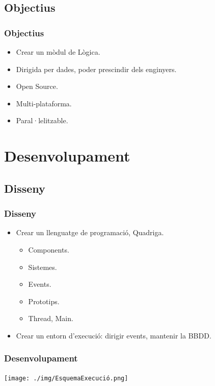 \documentclass[serif,9pt]{beamer}
\begin{document}
  \subsection{Objectius}

    \begin{frame}\frametitle{Objectius}
      \begin{itemize}
        \item Crear un mòdul de Lògica. \pause
        \item Dirigida per dades, poder prescindir dels enginyers. \pause
        \item Open Source. \pause
        \item Multi-plataforma. \pause
        \item Paral·lelitzable.
      \end{itemize}
    \end{frame}

\section{Desenvolupament}

  \subsection{Disseny}

    \begin{frame}\frametitle{Disseny}
      \begin{itemize}
        \item Crear un llenguatge de programació, Quadriga. \pause\medskip
        \begin{itemize}
          \item Components.
          \item Sistemes.
          \item Events.
          \item Prototips.
          \item Thread, Main.
        \end{itemize}\pause
        \item Crear un entorn d'execució: dirigir events, mantenir la BBDD.
      \end{itemize}
    \end{frame}
  
    \begin{frame}\frametitle{Desenvolupament}
      \texttt{[image: ./img/EsquemaExecució.png]}
    \end{frame}
\end{document}
